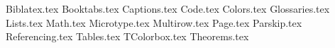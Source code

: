 {Biblatex.tex}
{Booktabs.tex}
{Captions.tex}
{Code.tex}
{Colors.tex}
{Glossaries.tex}
{Lists.tex}
{Math.tex}
{Microtype.tex}
{Multirow.tex}
{Page.tex}
{Parskip.tex}
{Referencing.tex}
{Tables.tex}
{TColorbox.tex}
{Theorems.tex}
\usepackage[english]{babel}
\usepackage{algorithm}
\usepackage{algpseudocode}
\usepackage{blindtext}
\usepackage{csquotes}
\usepackage{datetime2}
\usepackage{expl3}
\usepackage{float}
\usepackage{fontspec}
\usepackage{graphicx}
\usepackage{kbordermatrix}
\usepackage{keyval}
\usepackage{url}
\usepackage{xparse}
\usepackage{tocloft}
